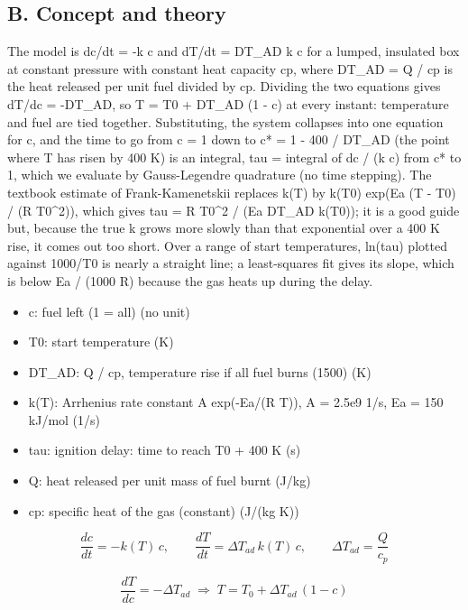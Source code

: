 \documentclass[11pt,a4paper]{article}
\begin{document}
\subsection*{B. Concept and theory}
The model is dc/dt = -k c and dT/dt = DT\_AD k c for a lumped, insulated box at constant pressure with constant heat capacity cp, where DT\_AD = Q / cp is the heat released per unit fuel divided by cp. Dividing the two equations gives dT/dc = -DT\_AD, so T = T0 + DT\_AD (1 - c) at every instant: temperature and fuel are tied together. Substituting, the system collapses into one equation for c, and the time to go from c = 1 down to c* = 1 - 400 / DT\_AD (the point where T has risen by 400 K) is an integral, tau = integral of dc / (k c) from c* to 1, which we evaluate by Gauss-Legendre quadrature (no time stepping). The textbook estimate of Frank-Kamenetskii replaces k(T) by k(T0) exp(Ea (T - T0) / (R T0\textasciicircum{}2)), which gives tau = R T0\textasciicircum{}2 / (Ea DT\_AD k(T0)); it is a good guide but, because the true k grows more slowly than that exponential over a 400 K rise, it comes out too short. Over a range of start temperatures, ln(tau) plotted against 1000/T0 is nearly a straight line; a least-squares fit gives its slope, which is below Ea / (1000 R) because the gas heats up during the delay.

\begin{itemize}[nosep]
\item c: fuel left (1 = all) (no unit)
\item T0: start temperature (K)
\item DT\_AD: Q / cp, temperature rise if all fuel burns (1500) (K)
\item k(T): Arrhenius rate constant A exp(-Ea/(R T)), A = 2.5e9 1/s, Ea = 150 kJ/mol (1/s)
\item tau: ignition delay: time to reach T0 + 400 K (s)
\item Q: heat released per unit mass of fuel burnt (J/kg)
\item cp: specific heat of the gas (constant) (J/(kg K))
\end{itemize}

\begin{equation*}
\frac{dc}{dt}=-k(T)\,c,\qquad \frac{dT}{dt}=\Delta T_{ad}\,k(T)\,c,\qquad \Delta T_{ad}=\frac{Q}{c_p}
\end{equation*}

\begin{equation*}
\frac{dT}{dc}=-\Delta T_{ad}\;\Rightarrow\; T=T_0+\Delta T_{ad}\,(1-c)
\end{equation*}
\end{document}
